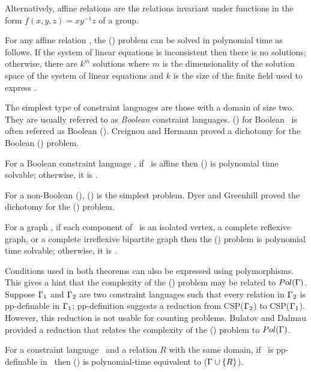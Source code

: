 Alternatively, affine relations are the relations invariant under functions in the form
\(f(x,y,z)=xy^{-1}z\) of a group.

For any affine relation \mR, the \ccsp(\mR) problem can be solved in polynomial time
as follows. If the system of linear equations is inconsistent
then there is no solutions; otherwise, there are \(k^m\) solutions where \(m\) is the
dimensionality of the solution space of the system of linear equations and
\(k\) is the size of the finite field used to express \mR\@.

The simplest type of constraint languages are those 
with a domain of size two. They are usually 
referred to as \emph{Boolean} constraint languages.
\ccsp(\mrelset) for Boolean \mrelset\ is often referred as Boolean \ccsp(\mrelset)\@.
Creignou and Hermann proved a dichotomy for the Boolean \ccsp(\mrelset) problem.

\begin{theorem}  
For a Boolean constraint language \mrelset,
if  \mrelset\ is affine then \ccsp(\mrelset) 
is polynomial time solvable; otherwise, it is \cpc\@.
\end{theorem}

For a non-Boolean \ccsp(\mrelset), \chom(\mH) is the simplest problem.
Dyer and Greenhill proved the dichotomy for the \chom(\mH) problem. 

\begin{theorem} 
For a graph \mH, if each component of \mH\ is an isolated vertex, a complete reflexive graph,
or a complete irreflexive bipartite graph then the \chom(\mH) problem 
is polynomial time solvable; otherwise, it is \cpc\@.
\end{theorem}

Conditions used in both theorems can also be expressed using polymorphisms. This gives a hint
that the complexity of the \ccsp(\mrelset) problem may be related to \(Pol(\Gamma)\)\@.
Suppose  \(\Gamma_1\) and \(\Gamma_2\) are two constraint languages such that
every relation in \(\Gamma_2\) is pp-definable in \(\Gamma_1\); 
pp-definition suggests a reduction from CSP(\(\Gamma_2\))
to CSP(\(\Gamma_1\))\@. However, this reduction is not usable for counting problems. 
Bulatov and Dalmau provided a reduction that relates 
the complexity of the \ccsp(\mrelset) problem to \(Pol(\Gamma)\)\@.

\begin{theorem} 
For a constraint language \mrelset\ and a relation \(R\) with the same domain,
if \mR\ is pp-definable in \mrelset\ then \ccsp(\mrelset) is polynomial-time equivalent 
to \ccsp(\(\Gamma \cup \{{R}\}\))\@.
\end{theorem}


